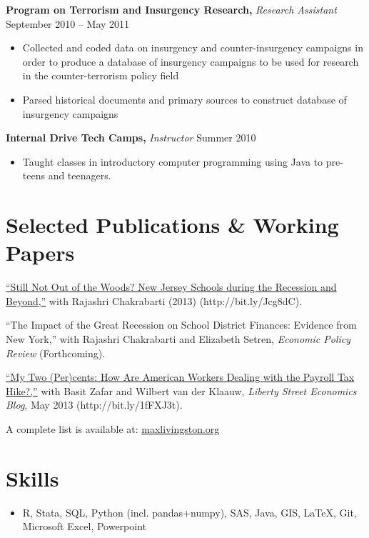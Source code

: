 \documentclass{res}
\begin{document}
\begin{resume}
  {\bf Program on Terrorism and Insurgency Research,} {\it Research Assistant}  \hfill  September 2010 -- May 2011
  \begin{itemize} \itemsep -2pt %
  \item Collected and coded data on insurgency and counter-insurgency campaigns in order to produce a database of insurgency campaigns to be used for research in the counter-terrorism policy field
  \item Parsed historical documents and primary sources to construct database of insurgency campaigns
  \end{itemize}

  {\bf Internal Drive Tech Camps,} {\it Instructor} \hfill Summer 2010
  \begin{itemize} \itemsep -2pt  %
  \item Taught classes in introductory computer programming using Java to pre-teens and teenagers.
  \end{itemize}
  
  \section{Selected Publications \& Working Papers} 
  \href{http://bit.ly/Jcg8dC}{``Still Not Out of the Woods? New Jersey Schools during the Recession and Beyond,''} with Rajashri Chakrabarti (2013) (http://bit.ly/Jcg8dC). 

  ``The Impact of the Great Recession on School District Finances: Evidence from New York,'' with Rajashri Chakrabarti and Elizabeth Setren, {\it Economic Policy Review} (Forthcoming).

  \href{http://bit.ly/1fFXJ3t}{``My Two (Per)cents: How Are American Workers Dealing with the Payroll Tax Hike?,''} with Basit Zafar and Wilbert van der Klaauw, {\it Liberty Street Economics Blog}, May 2013 (http://bit.ly/1fFXJ3t).

  A complete list is available at: \href{http://maxlivingston.org}{maxlivingston.org}
  \section{Skills}
  \begin{itemize} \itemsep -2pt
  \item R, Stata, SQL, Python (incl. pandas+numpy), SAS, Java, GIS, \LaTeX, Git, Microsoft Excel, Powerpoint
  \end{itemize}

\end{resume} 
\end{document}
